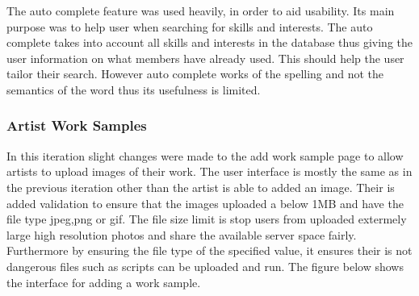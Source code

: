 \documentclass[a4paper,oneside,11pt]{report}
\begin{document}
The auto complete feature was used heavily, in order to aid usability. Its main purpose was to help user when searching for skills and interests. The auto complete takes into account all skills and interests in the database thus giving the user information on what members have already used. This should help the user tailor their search. However auto complete works of the spelling and not the semantics of the word thus its usefulness is limited.
\pagebreak
\subsubsection{Artist Work Samples}
In this iteration slight changes were made to the add work sample page to allow artists to upload images of their work. The user interface is mostly the same as in the previous iteration other than the artist is able to added an image. Their is added validation to ensure that the images uploaded a below 1MB and have the file type jpeg,png or gif. The file size limit is stop users from uploaded extermely large high resolution photos and share the available server space fairly. Furthermore by ensuring the file type of the specified value, it ensures their is not dangerous files such as scripts can be uploaded and run. The figure below shows the interface for adding a work sample.
\end{document}
